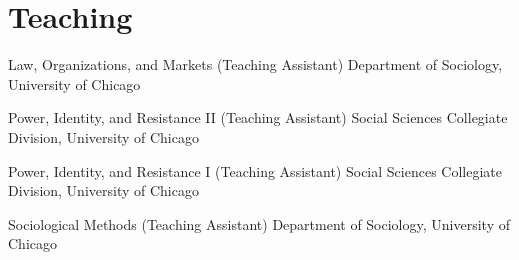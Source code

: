 
\section*{Teaching}

{Law, Organizations, and Markets (Teaching Assistant)}
{Department of Sociology, University of Chicago}

{Power, Identity, and Resistance II (Teaching Assistant)}
{Social Sciences Collegiate Division, University of Chicago}

{Power, Identity, and Resistance I (Teaching Assistant)}
{Social Sciences Collegiate Division, University of Chicago}

{Sociological Methods (Teaching Assistant)}
{Department of Sociology, University of Chicago}
